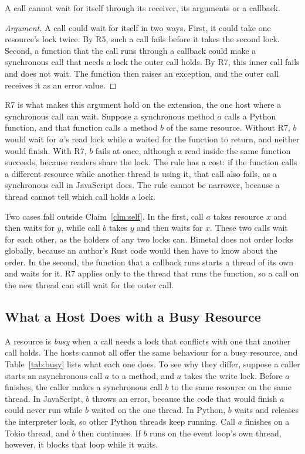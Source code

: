 \documentclass[sigconf,nonacm]{acmart}
\begin{document}
\begin{claim}
\label{clm:self}
A call cannot wait for itself through its receiver, its arguments or a callback.
\end{claim}

\begin{proof}[Argument]
A call could wait for itself in two ways. First, it could take one resource's lock twice. By R5, such a call fails before it takes the second lock. Second, a function that the call runs through a callback could make a synchronous call that needs a lock the outer call holds. By R7, this inner call fails and does not wait. The function then raises an exception, and the outer call receives it as an error value.
\end{proof}

R7 is what makes this argument hold on the extension, the one host where a synchronous call can wait. Suppose a synchronous  method $a$ calls a Python function, and that function calls a  method $b$ of the same resource. Without R7, $b$ would wait for $a$'s read lock while $a$ waited for the function to return, and neither would finish. With R7, $b$ fails at once, although a read inside the same function succeeds, because readers share the lock. The rule has a cost: if the function calls a different resource while another thread is using it, that call also fails, as a synchronous call in JavaScript does. The rule cannot be narrower, because a thread cannot tell which call holds a lock.

Two cases fall outside Claim~\ref{clm:self}. In the first, call $a$ takes resource $x$ and then waits for $y$, while call $b$ takes $y$ and then waits for $x$. These two calls wait for each other, as the holders of any two locks can. Bimetal does not order locks globally, because an author's Rust code would then have to know about the order. In the second, the function that a callback runs starts a thread of its own and waits for it. R7 applies only to the thread that runs the function, so a call on the new thread can still wait for the outer call.

\subsection{What a Host Does with a Busy Resource}

A resource is \emph{busy} when a call needs a lock that conflicts with one that another call holds. The hosts cannot all offer the same behaviour for a busy resource, and Table~\ref{tab:busy} lists what each one does. To see why they differ, suppose a caller starts an asynchronous call $a$ to a  method, and $a$ takes the write lock. Before $a$ finishes, the caller makes a synchronous call $b$ to the same resource on the same thread. In JavaScript, $b$ throws an error, because the code that would finish $a$ could never run while $b$ waited on the one thread. In Python, $b$ waits and releases the interpreter lock, so other Python threads keep running. Call $a$ finishes on a Tokio thread, and $b$ then continues. If $b$ runs on the event loop's own thread, however, it blocks that loop while it waits.
\end{document}
